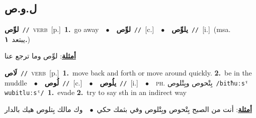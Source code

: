 \documentclass[10pt,a4paper,twoside]{article} %
\begin{document}
\begin{multicols}{2}
\vspace{-3mm}
\subsection*{\color{blue}\foreignlanguage{arabic}{ل.و.ص}\color{blue}{}} 

{\setlength\topsep{0pt}\textbf{\foreignlanguage{arabic}{لوِّص}}\ {\color{gray}\texttt{//}\color{black}}\ \textsc{verb}\ [p.]\ \textbf{1.}~go away\ \ $\bullet$\ \ \setlength\topsep{0pt}\textbf{\foreignlanguage{arabic}{لوِّص}}\ {\color{gray}\texttt{//}\color{black}}\ [c.]\ \ $\bullet$\ \ \setlength\topsep{0pt}\textbf{\foreignlanguage{arabic}{يلوِّص}}\ {\color{gray}\texttt{//}\color{black}}\ [i.]\ \color{gray}(msa. \foreignlanguage{arabic}{يبتعد}~\foreignlanguage{arabic}{\textbf{١.}})\color{black}\  \begin{flushright}\color{gray}\foreignlanguage{arabic}{\textbf{\underline{\foreignlanguage{arabic}{أمثلة}}}: لوِّص وما ترجع عنا}\end{flushright}\color{black}} \vspace{2mm}

{\setlength\topsep{0pt}\textbf{\foreignlanguage{arabic}{لَاص}}\ {\color{gray}\texttt{//}\color{black}}\ \textsc{verb}\ [p.]\ \textbf{1.}~move back and forth or move around quickly.  \textbf{2.}~be in the muddle\ \ $\bullet$\ \ \setlength\topsep{0pt}\textbf{\foreignlanguage{arabic}{لُوص}}\ {\color{gray}\texttt{//}\color{black}}\ [c.]\ \ $\bullet$\ \ \setlength\topsep{0pt}\textbf{\foreignlanguage{arabic}{يلُوص}}\ {\color{gray}\texttt{//}\color{black}}\ [i.]\ \ $\bullet$\ \ \textsc{ph.} \color{gray} \foreignlanguage{arabic}{بِتْحوص وبِتْلوص}\color{black}\ {\color{gray}\texttt{/{\sffamily bitħuːsˤ wubitluːsˤ}/}\color{black}}\ \textbf{1.}~evade  \textbf{2.}~try to say sth in an indirect way\  \begin{flushright}\color{gray}\foreignlanguage{arabic}{\textbf{\underline{\foreignlanguage{arabic}{أمثلة}}}: أنت من الصبح بِتْحوص وبِتْلوص وفي بثمك حكي\ $\bullet$\ \  وك مالك بِتلوص هيك بالدار}\end{flushright}\color{black}} \vspace{2mm}


\end{multicols}
\end{document}
